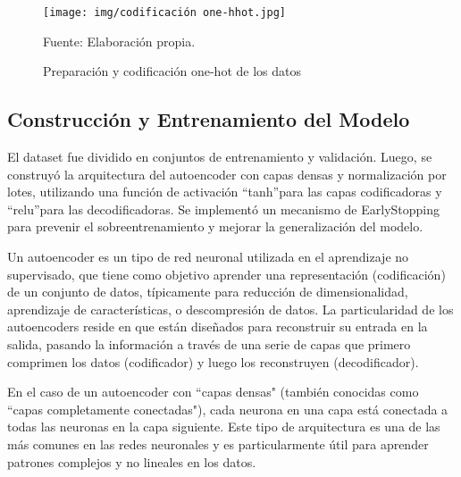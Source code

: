 \begin{figure}[H]
    \begin{minipage}[t]{0.9\textwidth}
        \caption{Preparación y codificación one-hot de los datos}
        \label{codificación_autoencoder}        
    \end{minipage}

    \vspace{10pt}

    \begin{minipage}[b]{0.9\textwidth}
        \centering
        \texttt{[image: img/codificación one-hhot.jpg]}        
    \end{minipage}

    \begin{minipage}[t]{0.9\textwidth}
        Fuente: Elaboración propia.
    \end{minipage}
\end{figure}


\subsection{Construcción y Entrenamiento del Modelo}

El dataset fue dividido en conjuntos de entrenamiento y validación. Luego, se construyó la arquitectura del autoencoder con capas densas y normalización por lotes, utilizando una función de activación \textquotedblleft tanh\textquotedblright para las capas codificadoras y \textquotedblleft relu\textquotedblright para las decodificadoras. Se implementó un mecanismo de EarlyStopping para prevenir el sobreentrenamiento y mejorar la generalización del modelo.

Un autoencoder es un tipo de red neuronal utilizada en el aprendizaje no supervisado, que tiene como objetivo aprender una representación (codificación) de un conjunto de datos, típicamente para reducción de dimensionalidad, aprendizaje de características, o descompresión de datos. La particularidad de los autoencoders reside en que están diseñados para reconstruir su entrada en la salida, pasando la información a través de una serie de capas que primero comprimen los datos (codificador) y luego los reconstruyen (decodificador).

En el caso de un autoencoder con \textquotedblleft capas densas" (también conocidas como \textquotedblleft capas completamente conectadas"), cada neurona en una capa está conectada a todas las neuronas en la capa siguiente. Este tipo de arquitectura es una de las más comunes en las redes neuronales y es particularmente útil para aprender patrones complejos y no lineales en los datos.

